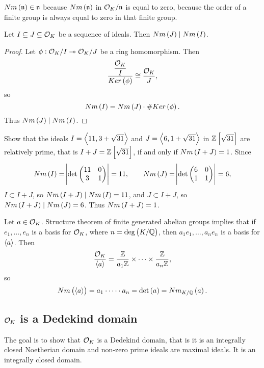 
\begin{remark*}
$ Nm\br{\nn} \in \nn $ because $ Nm\br{\nn} $ in $ \mathcal{O}_K / \mathfrak{n} $ is equal to zero, because the order of a finite group is always equal to zero in that finite group.
\end{remark*}

\begin{proposition}
Let $ I \subseteq J \subseteq \mathcal{O}_K $ be a sequence of ideals. Then $ Nm\br{J} \mid Nm\br{I} $.
\end{proposition}

\begin{proof}
Let $ \phi : \mathcal{O}_K / I \twoheadrightarrow \mathcal{O}_K / J $ be a ring homomorphism. Then
$$ \dfrac{\dfrac{\OO_K}{I}}{Ker\br{\phi}} \cong \dfrac{\OO_K}{J}, $$
so
$$ Nm\br{I} = Nm\br{J} \cdot \#Ker\br{\phi}. $$
Thus $ Nm\br{J} \mid Nm\br{I} $.
\end{proof}

\begin{example*}
Show that the ideals $ I = \left\langle 11, 3 + \sqrt{31} \right\rangle $ and $ J = \left\langle 6, 1 + \sqrt{31} \right\rangle $ in $ \Z\sbr{\sqrt{31}} $ are relatively prime, that is $ I + J = \Z\sbr{\sqrt{31}} $, if and only if $ Nm\br{I + J} = 1 $. Since
$$ Nm\br{I} = \abs{\det\twobytwo{11}{0}{3}{1}} = 11, \qquad Nm\br{J} = \abs{\det\twobytwo{6}{0}{1}{1}} = 6, $$
$ I \subset I + J $, so $ Nm\br{I + J} \mid Nm\br{I} = 11 $, and $ J \subset I + J $, so $ Nm\br{I + J} \mid Nm\br{J} = 6 $. Thus $ Nm\br{I + J} = 1 $.
\end{example*}

Let $ a \in \mathcal{O}_K $. Structure theorem of finite generated abelian groups implies that if $ e_1, \dots, e_n $ is a basis for $ \mathcal{O}_K $, where $ n = \deg\br{K / \Q} $, then $ a_1e_1, \dots, a_ne_n $ is a basis for $ \left\langle a \right\rangle $. Then
$$ \dfrac{\mathcal{O}_K}{\left\langle a \right\rangle} = \dfrac{\mathbb{Z}}{a_1\mathbb{Z}} \times \dots \times \dfrac{\mathbb{Z}}{a_n\mathbb{Z}}, $$
so
$$ Nm\br{\abr{a}} = a_1 \cdot \dots \cdot a_n = \det\br{a} = Nm_{K / \Q}\br{a}. $$

\pagebreak

\subsection{\texorpdfstring{$ \mathcal{O}_K $}{OK} is a Dedekind domain}

The goal is to show that $ \mathcal{O}_K $ is a Dedekind domain, that is it is an integrally closed Noetherian domain and non-zero prime ideals are maximal ideals. It is an integrally closed domain.

